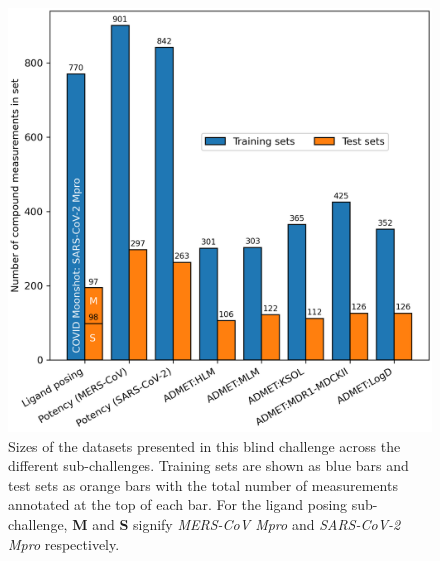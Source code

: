 \documentclass[journal=jcim,manuscript=article]{achemso}
\begin{document}
\begin{figure}
    \includegraphics[scale=0.5]{01_figs_introduction/datasets_overview.png}
  \caption{Sizes of the datasets presented in this blind challenge across the different sub-challenges. Training sets are shown as blue bars and test sets as orange bars with the total number of measurements annotated at the top of each bar. For the ligand posing sub-challenge, \textbf{M} and \textbf{S} signify \textit{MERS-CoV Mpro} and \textit{SARS-CoV-2 Mpro} respectively. }
  \label{fgr:datasets_overview}
\end{figure}


\end{document}
